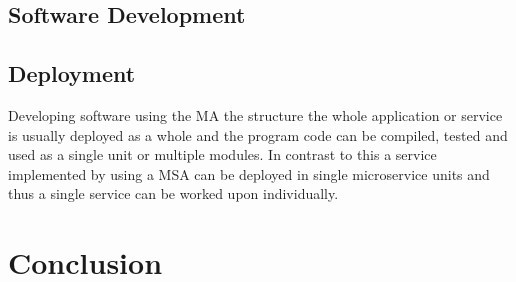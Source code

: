     \subsection{Software Development}
    \subsection{Deployment}
        \begin{sloppypar}

            Developing software using the MA the structure the whole application or service 
            is usually deployed as a whole and the program code can be compiled, tested and
            used as a single unit or multiple modules. In contrast to this a service implemented 
            by using a MSA can be deployed in single microservice units and thus a single service 
            can be worked upon individually.
        
        \end{sloppypar}







\section{Conclusion}




